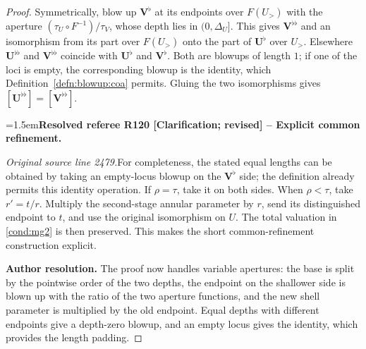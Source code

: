 \documentclass[12pt]{amsart}
\newcommand{\ResolvedRefereeRemark}[5]{%
  \par\medskip\begingroup\normalfont\small\color{gray}%
  \emergencystretch=1.5em\noindent\textbf{Resolved referee R#1 [#2] -- #3.}\par\nobreak\noindent #4\par
  \medskip\color{ResolutionGreen}\noindent\textbf{Author resolution.} #5\par
  \endgroup\medskip
}
\theoremstyle{plain}
\theoremstyle{definition}
\theoremstyle{remark}
\numberwithin{equation}{section}
\theoremstyle{plain}
\newcommand{\0}{\emptyset}
\begin{document}
\begin{proof}
Symmetrically, blow up $\bm V^{\flat}$ at its endpoints over $F(U_{>})$ with the aperture $(\tau_U \circ F^{-1})/\tau_V$, whose depth lies in $(0, \Delta_U]$. This gives $\bm V^{\flat\flat}$ and an isomorphism from its part over $F(U_{>})$ onto the part of $\bm U^{\flat}$ over $U_{>}$. Elsewhere $\bm U^{\flat\flat}$ and $\bm V^{\flat\flat}$ coincide with $\bm U^{\flat}$ and $\bm V^{\flat}$. Both are blowups of length $1$; if one of the loci is empty, the corresponding blowup is the identity, which Definition~\ref{defn:blowup:coa} permits. Gluing the two isomorphisms gives $[\bm U^{\flat\flat}] = [\bm V^{\flat\flat}]$.

\ResolvedRefereeRemark{120}{Clarification; revised}{Explicit common refinement}{%
\textit{Original source line 2479.}\quad For completeness, the stated equal lengths can be obtained by taking an empty-locus blowup on the $\bm V^\flat$ side; the definition already permits this identity operation. If $\rho=\tau$, take it on both sides. When $\rho<\tau$, take $r'=t/r$. Multiply the second-stage annular parameter by $r$, send its distinguished endpoint to $t$, and use the original isomorphism on $U$. The total valuation in \eqref{cond:mg2} is then preserved. This makes the short common-refinement construction explicit.
}{The proof now handles variable apertures: the base is split by the pointwise order of the two depths, the endpoint on the shallower side is blown up with the ratio of the two aperture functions, and the new shell parameter is multiplied by the old endpoint. Equal depths with different endpoints give a depth-zero blowup, and an empty locus gives the identity, which provides the length padding.}
\end{proof}
\end{document}
